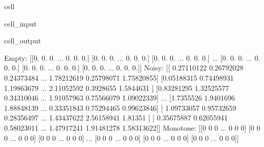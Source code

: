 \documentclass[letterpaper,10pt,english]{jupyterBook}
\begin{document}
\begin{sphinxuseclass}{cell}\begin{sphinxVerbatimInput}

\begin{sphinxuseclass}{cell_input}
\begin{sphinxVerbatim}[commandchars=\\\{\}]
\end{sphinxVerbatim}

\end{sphinxuseclass}\end{sphinxVerbatimInput}
\begin{sphinxVerbatimOutput}

\begin{sphinxuseclass}{cell_output}
\begin{sphinxVerbatim}[commandchars=\\\{\}]
Empty:
 [[0. 0. 0. ... 0. 0. 0.]
 [0. 0. 0. ... 0. 0. 0.]
 [0. 0. 0. ... 0. 0. 0.]
 ...
 [0. 0. 0. ... 0. 0. 0.]
 [0. 0. 0. ... 0. 0. 0.]
 [0. 0. 0. ... 0. 0. 0.]]
Noisy:
 [[ 0.27110122 \PYGZhy{}0.26792028  0.24373484 ... \PYGZhy{}1.78212619 \PYGZhy{}0.25798071
  \PYGZhy{}1.75820855]
 [\PYGZhy{}0.05188315  0.74498931 \PYGZhy{}1.19863679 ...  2.11052592 \PYGZhy{}0.3928655
   1.5844631 ]
 [\PYGZhy{}0.83281295  1.32525577 \PYGZhy{}0.34310046 ...  1.91057963 \PYGZhy{}0.75566079
  \PYGZhy{}1.09022339]
 ...
 [\PYGZhy{}1.7355526   1.9401696  \PYGZhy{}1.88848139 ... \PYGZhy{}0.33351843 \PYGZhy{}0.75294465
  \PYGZhy{}0.99623846]
 [ 1.09733057 \PYGZhy{}0.95732659 \PYGZhy{}0.28356497 ... \PYGZhy{}1.43437622  2.56158941
  \PYGZhy{}1.81351   ]
 [ 0.35675887 \PYGZhy{}0.62055941  0.58023011 ...  1.47917241 \PYGZhy{}1.91481278
   1.58313622]]
Monotone:
 [[0 0 0 ... 0 0 0]
 [0 0 0 ... 0 0 0]
 [0 0 0 ... 0 0 0]
 ...
 [0 0 0 ... 0 0 0]
 [0 0 0 ... 0 0 0]
 [0 0 0 ... 0 0 0]]
\end{sphinxVerbatim}

\end{sphinxuseclass}\end{sphinxVerbatimOutput}

\end{sphinxuseclass}
\sphinxstepscope
\end{document}
